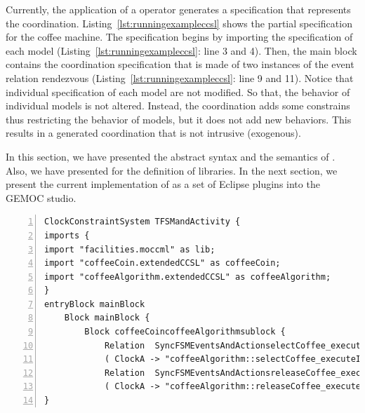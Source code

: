 Currently, the application of a \bcool operator generates a \ccsl specification that represents the coordination. Listing~\ref{lst:runningexampleccsl} shows the partial \ccsl specification for the coffee machine. The specification begins by importing the \ccsl specification of each model (Listing~\ref{lst:runningexampleccsl}: line 3 and 4). Then, the main block contains the coordination specification that is made of two instances of the event relation rendezvous (Listing~\ref{lst:runningexampleccsl}: line 9 and 11). Notice that individual specification of each model are not modified. So that, the behavior of individual models is not altered. Instead, the coordination adds some constrains thus restricting the behavior of models, but it does not add new behaviors. This results in a generated coordination that is not intrusive (\ie exogenous).

In this section, we have presented the abstract syntax and the semantics of \bcool. Also, we have presented \moccml for the definition of libraries. In the next section, we present the current implementation of \bcool as a set of Eclipse plugins into the GEMOC studio. 




\begin{lstlisting}[language=moccml,
caption={Resulting \ccsl specification for the running example},
label={lst:runningexampleccsl}, 
basicstyle=\scriptsize\ttfamily, backgroundcolor=\color{LGrey}, numbers=left, xleftmargin=2pt]
ClockConstraintSystem TFSMandActivity {
imports {
import "facilities.moccml" as lib;
import "coffeeCoin.extendedCCSL" as coffeeCoin;
import "coffeeAlgorithm.extendedCCSL" as coffeeAlgorithm;
}
entryBlock mainBlock
	Block mainBlock {
		Block coffeeCoincoffeeAlgorithmsublock {
			Relation  SyncFSMEventsAndActionselectCoffee_executeItselectCoffee_occurs [ RendezVous ]
			( ClockA -> "coffeeAlgorithm::selectCoffee_executeIt", ClockB -> "coffeeCoin::selectCoffee_occurs")
			Relation  SyncFSMEventsAndActionsreleaseCoffee_executeItreleaseCoffee_occurs [ RendezVous ]
			( ClockA -> "coffeeAlgorithm::releaseCoffee_executeIt", ClockB -> "coffeeCoin::releaseCoffee_occurs")}}
}
\end{lstlisting}    